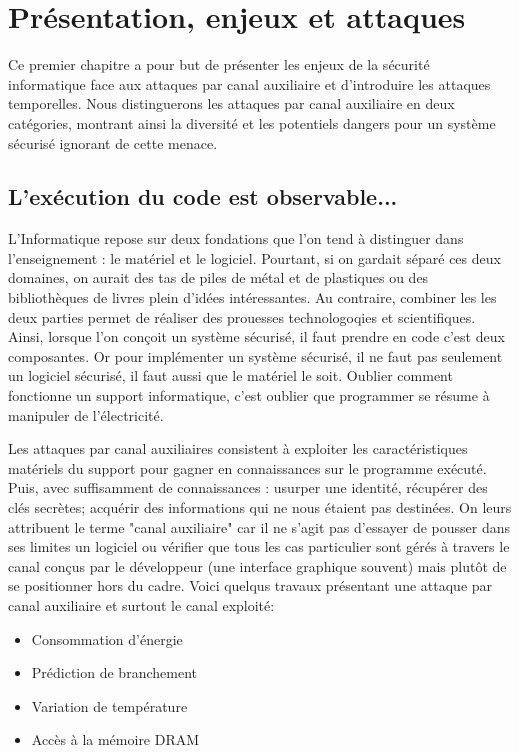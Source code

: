\chapter{Présentation, enjeux et attaques}
\label{chap:constantTimePresentation}


Ce premier chapitre a pour but de présenter les enjeux de la sécurité informatique face aux attaques par canal auxiliaire et d'introduire les attaques temporelles. Nous distinguerons les attaques par canal auxiliaire en deux catégories, montrant ainsi la diversité et les potentiels dangers pour un système sécurisé ignorant de cette menace.



\section{L'exécution du code est observable...}

L'Informatique repose sur deux fondations que l'on tend à distinguer dans l'enseignement : le matériel et le logiciel. Pourtant, si on gardait séparé ces deux domaines, on aurait des tas de piles de métal et de plastiques ou des bibliothèques de livres plein d'idées intéressantes. Au contraire, combiner les les deux parties permet de réaliser des prouesses technologoqies et scientifiques. Ainsi, lorsque l'on conçoit un système sécurisé, il faut prendre en code c'est deux composantes. Or pour implémenter un système sécurisé, il ne faut pas seulement un logiciel sécurisé, il faut aussi que le matériel le soit. Oublier comment fonctionne un support informatique, c'est oublier que programmer se résume à manipuler de l'électricité.\medbreak

Les attaques par canal auxiliaires consistent à exploiter les caractéristiques matériels du support pour gagner en connaissances sur le programme exécuté. Puis, avec suffisamment de connaissances : usurper une identité, récupérer des clés secrètes; acquérir des informations qui ne nous étaient pas destinées. On leurs attribuent le terme "canal auxiliaire" car il ne s'agit pas d'essayer de pousser dans ses limites un logiciel ou vérifier que tous les cas particulier sont gérés à travers le canal conçus par le développeur (une interface graphique souvent) mais plutôt de se positionner hors du cadre. Voici quelqus travaux présentant une attaque par canal auxiliaire et surtout le canal exploité:
\begin{itemize}
    \item[\cite{DPA_Attack}] Consommation d'énergie 
    \item[\cite{Branch_Attack}] Prédiction de branchement 
    \item[\cite{Thermal_Attack}] Variation de température
    \item[\cite{DRAM_Attack}] Accès à la mémoire DRAM
\end{itemize}\medbreak

